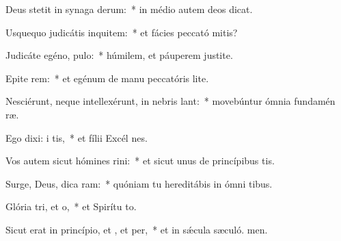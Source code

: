 \item Deus stetit in synaga derum:~* in médio autem deos dicat.
\item Usquequo judicátis inquitem:~* et fácies peccató mitis?
\item Judicáte egéno,  pulo:~* húmilem, et páuperem justite.
\item Epite rem:~* et egénum de manu peccatóris lite.
\item Nesciérunt, neque intellexérunt, in nebris lant:~* movebúntur ómnia fundamén ræ.
\item Ego dixi: i tis,~* et fílii Excél nes.
\item Vos autem sicut hómines rini:~* et sicut unus de princípibus tis.
\item Surge, Deus, dica ram:~* quóniam tu hereditábis in ómni tibus.
\item Glória tri, et o,~* et Spirítu to.
\item Sicut erat in princípio, et , et per,~* et in sǽcula sæculó. men.
